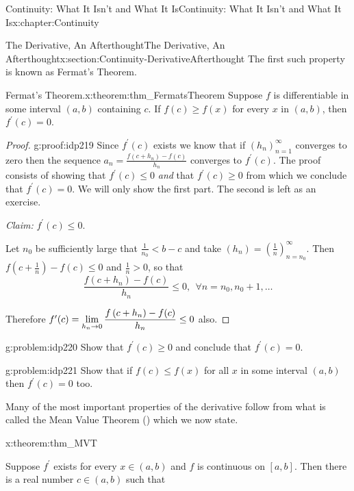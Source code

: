 \begin{chapterptx}{Continuity: What It Isn't and What It Is}{}{Continuity: What It Isn't and What It Is}{}{}{x:chapter:Continuity}
\begin{sectionptx}{The Derivative, An Afterthought}{}{The Derivative, An Afterthought}{}{}{x:section:Continuity-DerivativeAfterthought}
		The first such property is known as Fermat's Theorem.%
		\begin{theorem}{Fermat's Theorem.}{}{x:theorem:thm_FermatsTheorem}%
			Suppose \(f\) is differentiable in some interval \((a,b)\) containing \(c\).  If \(f(c)\ge f(x)\) for every \(x\) in \((a,b)\), then \(f^\prime(c)=0\).%
		\end{theorem}
		\begin{proof}{}{g:proof:idp219}
			Since \(f^\prime(c)\) exists we know that if \(\left(h_n\right)_{n=1}^\infty\) converges to zero then the sequence \(a_n = \frac{f\left(c+h_n\right)-f(c)}{h_n}\) converges to \(f^\prime(c)\).  The proof consists of showing that \(f^\prime(c)\leq 0\) \emph{and} that \(f^\prime(c)\geq
			0\) from which we conclude that \(f^\prime(c)= 0\).  We will only show the first part.  The second is left as an exercise.%
			\par
			\emph{Claim:} \(f^\prime(c)\leq 0\).%
			\par
			Let \(n_0\) be sufficiently large that \(\frac{1}{n_0}\lt b-c\) and take \(\left(h_n\right)=\left(\frac{1}{n}\right)_{n=n_0}^\infty\). Then \(f\left(c+\frac1n\right)-f(c) \leq 0\) and \(\frac1n>0\), so that%
			\begin{equation*}
				\frac{f\left(c+h_n\right)-f(c)}{h_n}\leq 0, \ \ \forall n=n_0, n_0+1, \ldots
			\end{equation*}
			\par
			Therefore \(f^\prime(c) = {\displaystyle\lim_{h_n\rightarrow 0}\frac{f\left(c+h_n\right)-f(c)}{h_n}} \leq 0\) also.%
		\end{proof}
		\begin{problem}{}{g:problem:idp220}%
			 Show that \(f^\prime(c) \geq 0\) and conclude that \(f^\prime(c) =0\).%
		\end{problem}
		\begin{problem}{}{g:problem:idp221}%
			 Show that if \(f(c) \leq f(x)\) for all \(x\) in some interval \((a,b)\) then \(f^\prime(c) =0\) too.%
		\end{problem}
		Many of the most important properties of the derivative follow from what is called the Mean Value Theorem () which we now state.%
		\begin{theorem}{}{}{x:theorem:thm_MVT}%
			\par
			 Suppose \(f^\prime\) exists for every \(x\in(a,b)\) and \(f\) is continuous on \([a,b]\). Then there is a real number \(c\in(a,b)\) such that%

\end{theorem}
\end{sectionptx}
\end{chapterptx}
